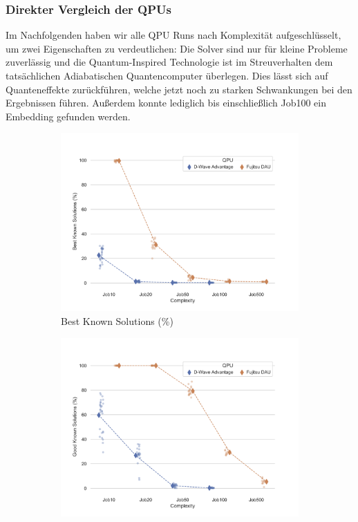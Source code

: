 \subsubsection{Direkter Vergleich der QPUs}
Im Nachfolgenden haben wir alle QPU Runs nach Komplexität aufgeschlüsselt, um zwei Eigenschaften zu verdeutlichen: Die Solver sind nur für kleine Probleme zuverlässig und die Quantum-Inspired Technologie ist im Streuverhalten dem tatsächlichen Adiabatischen Quantencomputer überlegen. Dies lässt sich auf Quanteneffekte zurückführen, welche jetzt noch zu starken Schwankungen bei den Ergebnissen führen. Außerdem konnte lediglich bis einschließlich Job100 ein Embedding gefunden werden.
\begin{figure}[H]
        \centering
        \begin{subfigure}[b]{0.475\textwidth}
            \centering
            \includegraphics[trim={0.75cm 0.5cm 1.25cm 1.7cm}, clip,width=\textwidth]{images/Best Known Solutions by Complexity.png}
            \caption[]%
            {{\small Best Known Solutions (\%)}}    
            \label{fig:BKS}
        \end{subfigure}
        \hfill
        \begin{subfigure}[b]{0.475\textwidth}  
            \centering 
            \includegraphics[trim={0.75cm 0.5cm 1.25cm 1.7cm}, clip,width=\textwidth]{images/Good Known Solutions by Complexity.png}

\end{subfigure}
\end{figure}
